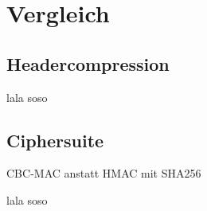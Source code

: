 \chapter{Vergleich}

\section{Headercompression}

lala  soso

\section{Ciphersuite}

CBC-MAC anstatt HMAC mit SHA256

lala  soso